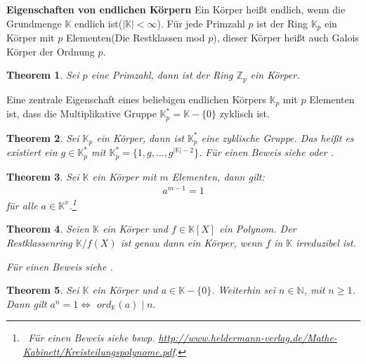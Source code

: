\documentclass[12pt,oneside]{article}
\newtheorem{theorem}{Theorem}[section]
\theoremstyle{remark}
\theoremstyle{definition}
\begin{document}
\textbf{Eigenschaften von endlichen Körpern}\newline
Ein Körper heißt endlich, wenn die Grundmenge $\mathbb{K}$ endlich ist($|\mathbb{K}| < \infty$). Für jede Primzahl $p$ ist der Ring $\mathbb{K}_p$ ein Körper mit $p$ Elementen(Die Restklassen mod $p$), dieser Körper heißt auch Galois Körper der Ordnung $p$.

\begin{theorem}
Sei $p$ eine Primzahl, dann ist der Ring $\mathbb{Z}_p$ ein Körper.
\end{theorem}

\smallskip

Eine zentrale Eigenschaft eines beliebigen endlichen Körpers $\mathbb{K}_p$ mit $p$ Elementen ist, dass die Multiplikative Gruppe $\mathbb{K}_p^{*} = \mathbb{K} - \{ 0\}$ zyklisch ist.

\begin{theorem}
Sei $\mathbb{K}_p$ ein Körper, dann ist $\mathbb{K}_p^{*}$ eine zyklische Gruppe. Das heißt es existiert ein $g \in \mathbb{K}_p^{*}$ mit $\mathbb{K}_p^{*} = \{1,g, \dots, g^{|\mathbb{K}| - 2} \}$. Für einen Beweis siehe \cite{D73} oder \cite{fields}. 
\end{theorem}

\begin{theorem}
Sei $\mathbb{K}$ ein Körper mit $m$ Elementen, dann gilt:
\begin{align*}
    a^{m-1} = 1
\end{align*}
für alle $a \in \mathbb{K}^x$.\footnote{$\,$ Für einen Beweis siehe bswp. \url{http://www.heldermann-verlag.de/Mathe-Kabinett/Kreisteilungspolynome.pdf}.}\newline
\end{theorem}

\begin{theorem}\label{irred-poly-over-ext-fields}
Seien $\mathbb{K}$ ein Körper und $f \in \mathbb{K}[X]$ ein Polynom. Der Restklassenring $\mathbb{K}/f(X)$ ist genau dann ein Körper, wenn $f$ in $\mathbb{K}$ irreduzibel ist.\newline

Für einen Beweis siehe \cite{fields}.
\end{theorem}

\smallskip

\begin{theorem}
Sei $\mathbb{K}$ ein Körper und $a \in \mathbb{K} - \{ 0 \}$. Weiterhin sei $ n \in \mathbb{N}$, mit $n \geq 1$. Dann gilt $a^n = 1 \Leftrightarrow	 $ $ord_{\mathbb{K}}(a) \mid n$. 
\end{theorem}
\end{document}
